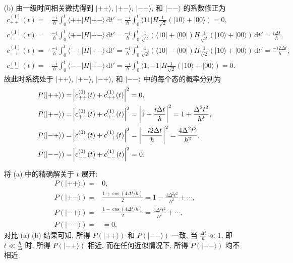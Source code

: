 \documentclass{assignment}
\begin{document}
\begin{sol}
\begin{itemize}
\begin{align}
        \end{align}
        \item[(b)] 由一级时间相关微扰得到 $\lvert++\rangle$, $\lvert+-\rangle$, $\lvert-+\rangle$, 和 $\lvert--\rangle$ 的系数修正为
        \begin{align}
            c_{++}^{(1)}(t)=&\frac{-i}{\hbar}\int_0^t\langle++\rvert H\lvert+-\rangle\,\mathrm{d}t'=\frac{-i}{\hbar}\int_0^t\langle 11\rvert H\frac{1}{\sqrt{2}}(\lvert 10\rangle+\lvert 00\rangle)=0,\\
            c_{+-}^{(1)}(t)=&\frac{-i}{\hbar}\int_0^t\langle+-\rvert H\lvert+-\rangle\,\mathrm{d}t'=\frac{-i}{\hbar}\int_0^t\frac{1}{\sqrt{2}}(\langle 10\rvert+\langle 00\rvert)H\frac{1}{\sqrt{2}}(\lvert 10\rangle+\lvert 00\rangle)\,\mathrm{d}t'=\frac{i\Delta t}{\hbar},\\
            c_{-+}^{(1)}(t)=&\frac{-i}{\hbar}\int_0^t\langle-+\rvert H\lvert+-\rangle\,\mathrm{d}t'=\frac{-i}{\hbar}\int_0^t\frac{1}{\sqrt{2}}(\langle 10\rvert-\langle 00\rvert)H\frac{1}{\sqrt{2}}(\lvert 10\rangle+\lvert 00\rangle)\,\mathrm{d}t'=\frac{-i2\Delta t}{\hbar},\\
            c_{--}^{(1)}(t)=&\frac{-i}{\hbar}\int_0^t\langle--\rvert H\lvert+-\rangle\,\mathrm{d}t'=\frac{-i}{\hbar}\int_0^t\langle 1,-1\rvert H\frac{1}{\sqrt{2}}(\lvert 10\rangle+\lvert 00\rangle)=0.
        \end{align}
        故此时系统处于 $\lvert++\rangle$, $\lvert+-\rangle$, $\lvert-+\rangle$, 和 $\lvert--\rangle$ 中的每个态的概率分别为
        \begin{align}
            P(\lvert++\rangle)=&\left\lvert c_{++}^{(0)}(t)+c_{++}^{(1)}(t)\right\rvert^2=0,\\
            P(\lvert+-\rangle)=&\left\lvert c_{+-}^{(0)}(t)+c_{+-}^{(1)}(t)\right\rvert^2=\left\lvert1+\frac{i\Delta t}{\hbar}\right\rvert^2=1+\frac{\Delta^2t^2}{\hbar^2},\\
            P(\lvert-+\rangle)=&\left\lvert c_{-+}^{(0)}(t)+c_{-+}^{(1)}(t)\right\rvert^2=\left\lvert\frac{-i2\Delta t}{\hbar}\right\rvert^2=\frac{4\Delta^2t^2}{\hbar^2},\\
            P(\lvert--\rangle)=&\left\lvert c_{--}^{(0)}(t)+c_{--}^{(1)}(t)\right\rvert^2=0.
        \end{align}

        将 (a) 中的精确解关于 $t$ 展开:
        \begin{align}
            P(\lvert++\rangle)=&0,\\
            P(\lvert+-\rangle)=&\frac{1+\cos(4\Delta t/\hbar)}{2}=1-\frac{4\Delta^2t^2}{\hbar^2}+\cdots,\\
            P(\lvert-+\rangle)=&\frac{1-\cos(4\Delta t/\hbar)}{2}=\frac{4\Delta^2t^2}{\hbar^2}+\cdots,\\
            P(\lvert--\rangle)=&=0.
        \end{align}
        对比 (a) (b) 结果可知, 所得 $P(\lvert++\rangle)$ 和 $P(\lvert--\rangle)$ 一致, 当 $\frac{\Delta t}{\hbar}\ll 1$, 即 $t\ll\frac{\hbar}{\Delta}$ 时, 所得 $P(\lvert-+\rangle)$ 相近, 而在任何近似情况下, 所得 $P(\lvert+-\rangle)$ 均不相近.
    \end{itemize}
\end{sol}
\end{document}
